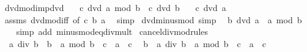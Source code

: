 \begin{isabellebody}
\isanewline
{}\isamarkupfalse%
%
\endisatagproof
{\isafoldproof}%
%
\isadelimproof
\isanewline
%
\endisadelimproof
\isanewline
{}\isamarkupfalse%
\ dvd{\isacharunderscore}{\kern0pt}mod{\isacharunderscore}{\kern0pt}imp{\isacharunderscore}{\kern0pt}dvd{\isacharcolon}{\kern0pt}\isanewline
\ \ \ {\isachardoublequoteopen}c\ dvd\ a\ mod\ b{\isachardoublequoteclose}\ \ {\isachardoublequoteopen}c\ dvd\ b{\isachardoublequoteclose}\isanewline
\ \ \ {\isachardoublequoteopen}c\ dvd\ a{\isachardoublequoteclose}\isanewline
%
\isadelimproof
\ \ %
\endisadelimproof
%
\isatagproof
{}\isamarkupfalse%
\ assms\ dvd{\isacharunderscore}{\kern0pt}mod{\isacharunderscore}{\kern0pt}iff\ {\isacharbrackleft}{\kern0pt}of\ c\ b\ a{\isacharbrackright}{\kern0pt}\ \isamarkupfalse%
\ simp%
\endisatagproof
{\isafoldproof}%
%
\isadelimproof
\isanewline
%
\endisadelimproof
\isanewline
{}\isamarkupfalse%
\ dvd{\isacharunderscore}{\kern0pt}minus{\isacharunderscore}{\kern0pt}mod\ {\isacharbrackleft}{\kern0pt}simp{\isacharbrackright}{\kern0pt}{\isacharcolon}{\kern0pt}\isanewline
\ \ {\isachardoublequoteopen}b\ dvd\ a\ {\isacharminus}{\kern0pt}\ a\ mod\ b{\isachardoublequoteclose}\isanewline
%
\isadelimproof
\ \ %
\endisadelimproof
%
\isatagproof
{}\isamarkupfalse%
\ {\isacharparenleft}{\kern0pt}simp\ add{\isacharcolon}{\kern0pt}\ minus{\isacharunderscore}{\kern0pt}mod{\isacharunderscore}{\kern0pt}eq{\isacharunderscore}{\kern0pt}div{\isacharunderscore}{\kern0pt}mult{\isacharparenright}{\kern0pt}%
\endisatagproof
{\isafoldproof}%
%
\isadelimproof
\isanewline
%
\endisadelimproof
\isanewline
{}\isamarkupfalse%
\ cancel{\isacharunderscore}{\kern0pt}div{\isacharunderscore}{\kern0pt}mod{\isacharunderscore}{\kern0pt}rules{\isacharcolon}{\kern0pt}\isanewline
\ \ {\isachardoublequoteopen}{\isacharparenleft}{\kern0pt}{\isacharparenleft}{\kern0pt}a\ div\ b{\isacharparenright}{\kern0pt}\ {\isacharasterisk}{\kern0pt}\ b\ {\isacharplus}{\kern0pt}\ a\ mod\ b{\isacharparenright}{\kern0pt}\ {\isacharplus}{\kern0pt}\ c\ {\isacharequal}{\kern0pt}\ a\ {\isacharplus}{\kern0pt}\ c{\isachardoublequoteclose}\isanewline
\ \ {\isachardoublequoteopen}{\isacharparenleft}{\kern0pt}b\ {\isacharasterisk}{\kern0pt}\ {\isacharparenleft}{\kern0pt}a\ div\ b{\isacharparenright}{\kern0pt}\ {\isacharplus}{\kern0pt}\ a\ mod\ b{\isacharparenright}{\kern0pt}\ {\isacharplus}{\kern0pt}\ c\ {\isacharequal}{\kern0pt}\ a\ {\isacharplus}{\kern0pt}\ c{\isachardoublequoteclose}\isanewline

\end{isabellebody}
